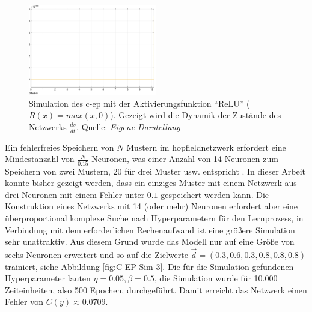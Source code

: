 \begin{figure}[h]
  \centering
  \includegraphics[width=0.5\textwidth]{abbildungen/c_ep_sim_7_state_dynamics.png}
  \caption{Simulation des \gls{c-ep} mit der Aktivierungsfunktion "`ReLU"' (\(R(x)=max(x,0)\)). Gezeigt wird die Dynamik der Zustände des Netzwerks \(\frac{ds}{dt}\). Quelle: \textit{Eigene Darstellung}}
  \label{fig:C-EP Sim 7}
\end{figure}

Ein fehlerfreies Speichern von \(N\) Mustern im \gls{hopfieldnetzwerk} erfordert eine Mindestanzahl von \(\frac{N}{0.15}\) Neuronen, was einer Anzahl von 14 Neuronen zum Speichern von zwei Mustern, 20 für drei Muster usw. entspricht \cite[vgl. S. 2556]{Hopfield1982}. In dieser Arbeit konnte bisher gezeigt werden, dass ein einziges Muster mit einem Netzwerk aus drei Neuronen mit einem Fehler unter \(0.1\) gespeichert werden kann. Die Konstruktion eines Netzwerks mit 14 (oder mehr) Neuronen erfordert aber eine überproportional komplexe Suche nach Hyperparametern für den Lernprozess, in Verbindung mit dem erforderlichen Rechenaufwand ist eine größere Simulation sehr unattraktiv. Aus diesem Grund wurde das Modell nur auf eine Größe von sechs Neuronen erweitert und so auf die Zielwerte \(\vec{d}=(0.3,0.6,0.3,0.8,0.8,0.8)\) trainiert, siehe Abbildung \ref{fig:C-EP Sim 3}. Die für die Simulation gefundenen Hyperparameter lauten \(\eta=0.05,\beta=0.5\), die Simulation wurde für 10.000 Zeiteinheiten, also 500 Epochen, durchgeführt. Damit erreicht das Netzwerk einen Fehler von \(C(y)\approx0.0709\).

